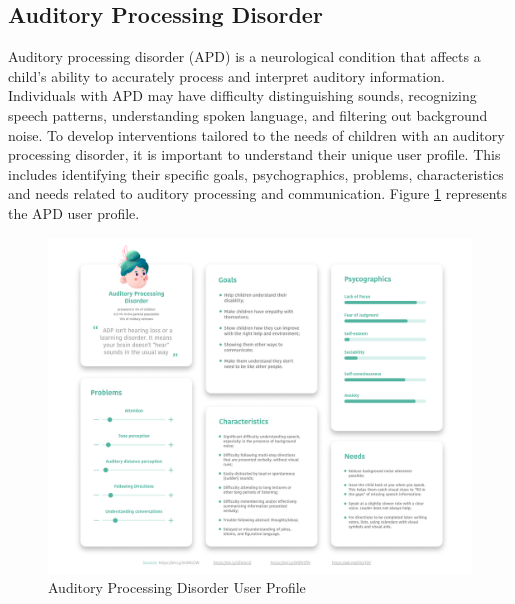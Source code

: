 \subsection{Auditory Processing Disorder}
Auditory processing disorder (APD) is a neurological condition that affects a child's ability to accurately process and interpret auditory information. Individuals with APD may have difficulty distinguishing sounds, recognizing speech patterns, understanding spoken language, and filtering out background noise. To develop interventions tailored to the needs of children with an auditory processing disorder, it is important to understand their unique user profile. This includes identifying their specific goals, psychographics, problems, characteristics and needs related to auditory processing and communication. Figure \ref{fig:APDUserProfile} represents the APD user profile.

\begin{figure}[H]
    \centering
    \includegraphics[width=1\linewidth]{Chapters/figma/Auditory Processing Disorder.png}
    \caption{Auditory Processing Disorder User Profile}
    \label{fig:APDUserProfile}
\end{figure}

